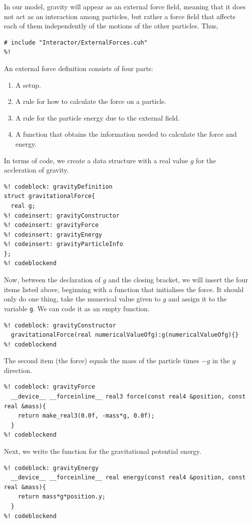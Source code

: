 In our model, gravity will appear as an external force field, meaning that it
does not act as an interaction among particles, but rather a force field that
affects each of them independently of the motions of the other particles. Thus,
\begin{lstlisting}
# include "Interactor/ExternalForces.cuh"
%!
\end{lstlisting}

An external force definition consists of four parts:
\begin{enumerate}
  \item A setup.
  \item A rule for how to calculate the force on a particle.
  \item A rule for the particle energy due to the external field.
  \item A function that obtains the information needed to calculate the force
        and energy.
\end{enumerate}
In terms of code, we create a data structure with a real value $g$ for the
accleration of gravity.
\begin{lstlisting}
%! codeblock: gravityDefinition
struct gravitationalForce{
  real g;
%! codeinsert: gravityConstructor
%! codeinsert: gravityForce
%! codeinsert: gravityEnergy
%! codeinsert: gravityParticleInfo
};
%! codeblockend
\end{lstlisting}
Now, between the declaration of $g$ and the closing bracket, we will insert the
four items listed above, beginning with a function that initialises the force.
It should only do one thing, take the numerical value given to $g$ and assign it
to the variable \texttt{g}. We can code it as an empty function.
\begin{lstlisting}
%! codeblock: gravityConstructor
  gravitationalForce(real numericalValueOfg):g(numericalValueOfg){}
%! codeblockend
\end{lstlisting}
The second item (the force) equals the mass of the particle times $-g$ in the
$y$ direction.
\begin{lstlisting}
%! codeblock: gravityForce
  __device__ __forceinline__ real3 force(const real4 &position, const real &mass){
    return make_real3(0.0f, -mass*g, 0.0f);
  }
%! codeblockend
\end{lstlisting}
Next, we write the function for the gravitational potential energy.
\begin{lstlisting}
%! codeblock: gravityEnergy
  __device__ __forceinline__ real energy(const real4 &position, const real &mass){
    return mass*g*position.y;
  }
%! codeblockend
\end{lstlisting}
